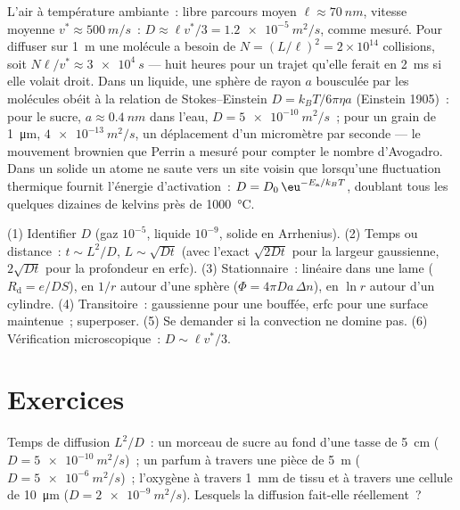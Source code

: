\begin{example}\label{ex:b2:particle-diffusion:kinetic}
L'air à température ambiante~: libre parcours moyen $\ell \approx \qty{70}{nm}$,
vitesse moyenne $v^* \approx \qty{500}{m/s}$~: $D \approx \ell v^*/3 =
\qty{1.2e-5}{m^2/s}$, comme mesuré. Pour diffuser sur \qty{1}{m} une molécule
a besoin de $N = (L/\ell)^2 = 2 \times 10^{14}$ collisions, soit $N\ell/v^*
\approx \qty{3e4}{s}$ --- huit heures pour un trajet qu'elle ferait en
\qty{2}{ms} si elle volait droit. Dans un liquide, une sphère de rayon $a$
bousculée par les molécules obéit à la relation de Stokes--Einstein $D =
k_BT/6\pi\eta a$ (Einstein 1905)~: pour le sucre, $a \approx \qty{0.4}{nm}$
dans l'eau, $D = \qty{5e-10}{m^2/s}$~; pour un grain de \qty{1}{\micro m},
$\qty{4e-13}{m^2/s}$, un déplacement d'un micromètre par seconde ---
le mouvement brownien que Perrin a mesuré pour compter le nombre d'Avogadro. Dans
un solide un atome ne saute vers un site voisin que lorsqu'une fluctuation
thermique fournit l'énergie d'activation~: $D = D_0\,\eu^{-E_{\text{a}}/k_BT}$,
doublant tous les quelques dizaines de kelvins près de \qty{1000}{\celsius}.
\end{example}

\begin{method}\label{meth:b2:particle-diffusion:method}
(1) Identifier $D$ (gaz $10^{-5}$, liquide $10^{-9}$, solide en Arrhenius).
(2) Temps ou distance~: $t \sim L^2/D$, $L \sim \sqrt{Dt}$ (avec l'exact
$\sqrt{2Dt}$ pour la largeur gaussienne, $2\sqrt{Dt}$ pour la profondeur en erfc).
(3) Stationnaire~: linéaire dans une lame ($R_{\text{d}} = e/DS$), en $1/r$ autour d'une
sphère ($\Phi = 4\pi D a\,\Delta n$), en $\ln r$ autour d'un cylindre. (4)
Transitoire~: gaussienne pour une bouffée, erfc pour une surface maintenue~; superposer.
(5) Se demander si la convection ne domine pas. (6) Vérification microscopique~:
$D \sim \ell v^*/3$.
\end{method}

\section{Exercices}

\begin{exercise}[$\star$]\label{exo:b2:particle-diffusion:1}
Temps de diffusion $L^2/D$~: un morceau de sucre au fond d'une tasse de \qty{5}{cm}
($D = \qty{5e-10}{m^2/s}$)~; un parfum à travers une pièce de \qty{5}{m} ($D =
\qty{5e-6}{m^2/s}$)~; l'oxygène à travers \qty{1}{mm} de tissu et à travers une
cellule de \qty{10}{\micro m} ($D = \qty{2e-9}{m^2/s}$). Lesquels la
diffusion fait-elle réellement~?
\end{exercise}

